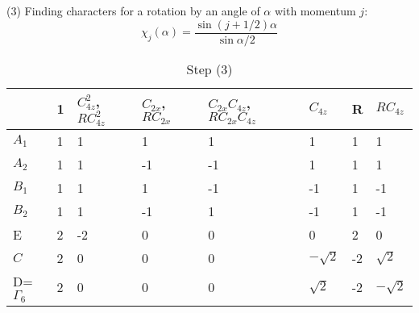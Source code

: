 (3) Finding characters for a rotation by an angle of $\alpha$ with momentum $j$:
$$\chi_j(\alpha)=\frac{\sin{(j+1/2)\alpha}}{\sin{\alpha/2}}$$

\begin{table}[h]
\begin{tabular}{l|lllllll}
             & 1 & $C_{4z}^2$, $RC_{4z}^2$ & $C_{2x}$, $RC_{2x}$ & $C_{2x}C_{4z}$, $RC_{2x}C_{4z}$ & $C_{4z}$    & R  & $RC_{4z}$   \\ \hline
$A_1$        & 1 & 1                       & 1                   & 1                               & 1           & 1  & 1           \\
$A_2$        & 1 & 1                       & -1                  & -1                              & 1           & 1  & 1           \\
$B_1$        & 1 & 1                       & 1                   & -1                              & -1          & 1  & -1          \\
$B_2$        & 1 & 1                       & -1                  & 1                               & -1          & 1  & -1          \\
E            & 2 & -2                      & 0                   & 0                               & 0           & 2  & 0           \\
$C$          & 2 & 0                       & 0                   & 0                               & $-\sqrt{2}$ & -2 & $\sqrt{2}$  \\
D=$\Gamma_6$ & 2 & 0                       & 0                   & 0                               & $\sqrt{2}$  & -2 & $-\sqrt{2}$
\end{tabular}
\caption{Step (3)}
\end{table}
\newpage
\cleardoublepage


